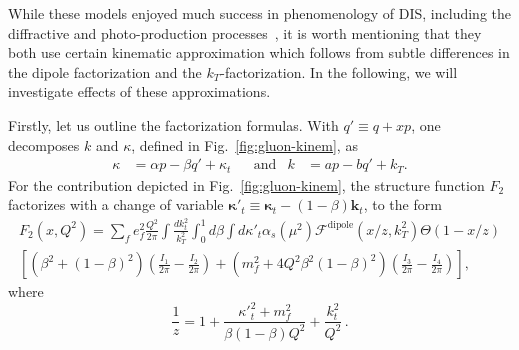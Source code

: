 \documentclass[11pt]{article}
\newcommand{\fdp}[0]{\mathcal{F}^{\mathrm{dipole}}}
\begin{document}
While these models enjoyed much success in phenomenology of DIS, including the
diffractive and photo-production
processes~\cite{Golec-Biernat:1998zce,Golec-Biernat:1999qor}, it is worth
mentioning that they both use certain kinematic approximation which follows from
subtle differences in the dipole factorization and the $k_T$-factorization.  In
the following, we will investigate effects of these approximations.

Firstly, let us outline the factorization formulas.
With $q'\equiv q+x p$, one decomposes $k$ and $\kappa$, defined in
Fig.~\ref{fig:gluon-kinem}, as
%
\begin{align}
    \kappa&=\alpha p-\beta q'+\kappa_t&&\mathrm{and}& k&=a p- bq'+k_T.
\end{align}
%
For the contribution depicted in Fig.~\ref{fig:gluon-kinem}, the structure
function $F_2$ factorizes with a change of variable
${\boldsymbol{\kappa}'}_t\equiv{\boldsymbol{\kappa}_t}-(1-\beta)\mathbf{k}_t$,
to the form~\cite{ Kimber:2001uaa,Kwiecinski:1997ee}
%
\begin{multline}
	F_2(x,Q^2)=\sum_f e_f^2 \frac{Q^2}{2\pi}\int\frac{dk^2_t}{k_T^2}\int^1_0d\beta\int d{\kappa'}_t\alpha_s(\mu^2) \fdp(x/z,k_T^2)\Theta(1-x/z)\\
	\left[\left(\beta^2+(1-\beta)^2\right)\left(\frac{I_1}{2\pi}-\frac{I_2}{2\pi}\right)
	+\left(m_f^2+4Q^2\beta^2(1-\beta)^2\right)\left(\frac{I_3}{2\pi}-\frac{I_4}{2\pi}\right)\right],
	\label{eq:angle-integrated}
\end{multline}
where
\begin{equation}
	\frac{1}{z}=1+\frac{{\kappa'}^2_t+m_f^2}{\beta(1-\beta)Q^2}+\frac{k^2_t}{Q^2}\,.
	\label{eq:z}
\end{equation}
\end{document}
